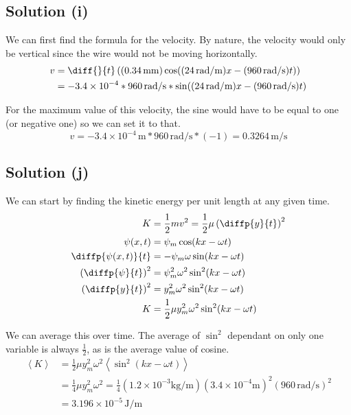 \documentclass[12pt]{article}
\newcommand{\E}[1]{\times 10^{#1}}
\begin{document}
        \subsection{Solution (i)}
            We can first find the formula for the velocity.
            By nature, the velocity would only be vertical since the wire would not be moving horizontally.
            \begin{align}
                v   &=  \diff{}{t}\left( (0.34\,\unit{\milli\meter}) \cos((24\,\unit{\radian/\meter})x - (960\,\unit{\radian/\second})t) \right)\\
                    &=  - 3.4\E{-4} * 960\,\unit{\radian/\second} * \sin((24\,\unit{\radian/\meter})x - (960\,\unit{\radian/\second})t)
            \end{align}

            For the maximum value of this velocity, the sine would have to be equal to one (or negative one) so we can set it to that.
            \begin{equation}
                v   =   -3.4\E{-4}\,\unit{\meter} * 960\,\unit{\radian/\second} * (-1)
                    =   \boxed{0.3264\,\unit{\meter/\second}}
            \end{equation}

        \subsection{Solution (j)}
            We can start by finding the kinetic energy per unit length at any given time.
            \begin{align}
                K   &=  \frac{1}{2}mv^2
                    =   \frac{1}{2}\mu\left( \diffp{y}{t} \right)^2\\
                \psi (x,t)  &=  \psi_m \cos(k x - \omega t)\\
                \diffp{\psi (x,t)}{t}   &=  -\psi_m \omega \sin(k x - \omega t)\\
                \left( \diffp{\psi}{t} \right)^2    &=  \psi_m^2 \omega^2 \sin^2(k x - \omega t)\\
                \left( \diffp{y}{t} \right)^2    &=  y_m^2 \omega^2 \sin^2(k x - \omega t)\\
                K   &=  \frac{1}{2}\mu y_m^2 \omega^2 \sin^2(k x - \omega t)
            \end{align}

            We can average this over time. The average of $\sin^2$ dependant on only one variable is always $\frac{1}{2}$, as is the average value of cosine. 
            \begin{align}
                \left\langle K \right\rangle    &=  \frac{1}{2}\mu y_m^2 \omega^2 \left\langle \sin^2(k x - \omega t) \right\rangle\\
                    &=  \frac{1}{4} \mu y_m^2 \omega^2
                    =   \frac{1}{4} (1.2\E{-3}\unit{\kilo\gram/\meter}) \left( 3.4\E{-4}\unit{\meter} \right)^2 (960\,\unit{\radian/\second})^2\\
                    &=  \boxed{3.196\E{-5}\,\unit{\joule/\meter}}
            \end{align}
\end{document}
